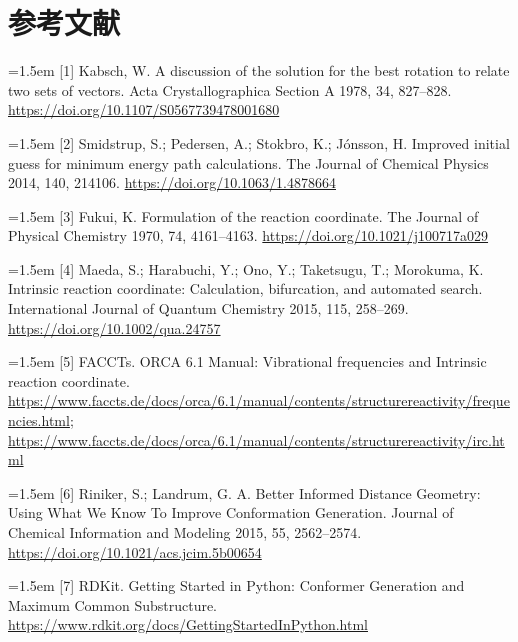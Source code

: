 \section*{参考文献}
\begingroup\fontsize{8.5}{10.5}\selectfont
\par\noindent\hangindent=1.5em [1] Kabsch, W. A discussion of the solution for the best rotation to relate two sets of vectors. Acta Crystallographica Section A 1978, 34, 827–828. \url{https://doi.org/10.1107/S0567739478001680}\par\smallskip
\par\noindent\hangindent=1.5em [2] Smidstrup, S.; Pedersen, A.; Stokbro, K.; Jónsson, H. Improved initial guess for minimum energy path calculations. The Journal of Chemical Physics 2014, 140, 214106. \url{https://doi.org/10.1063/1.4878664}\par\smallskip
\par\noindent\hangindent=1.5em [3] Fukui, K. Formulation of the reaction coordinate. The Journal of Physical Chemistry 1970, 74, 4161–4163. \url{https://doi.org/10.1021/j100717a029}\par\smallskip
\par\noindent\hangindent=1.5em [4] Maeda, S.; Harabuchi, Y.; Ono, Y.; Taketsugu, T.; Morokuma, K. Intrinsic reaction coordinate: Calculation, bifurcation, and automated search. International Journal of Quantum Chemistry 2015, 115, 258–269. \url{https://doi.org/10.1002/qua.24757}\par\smallskip
\par\noindent\hangindent=1.5em [5] FACCTs. ORCA 6.1 Manual: Vibrational frequencies and Intrinsic reaction coordinate. \url{https://www.faccts.de/docs/orca/6.1/manual/contents/structurereactivity/frequencies.html}; \url{https://www.faccts.de/docs/orca/6.1/manual/contents/structurereactivity/irc.html}\par\smallskip
\par\noindent\hangindent=1.5em [6] Riniker, S.; Landrum, G. A. Better Informed Distance Geometry: Using What We Know To Improve Conformation Generation. Journal of Chemical Information and Modeling 2015, 55, 2562–2574. \url{https://doi.org/10.1021/acs.jcim.5b00654}\par\smallskip
\par\noindent\hangindent=1.5em [7] RDKit. Getting Started in Python: Conformer Generation and Maximum Common Substructure. \url{https://www.rdkit.org/docs/GettingStartedInPython.html}\par\smallskip
\endgroup
